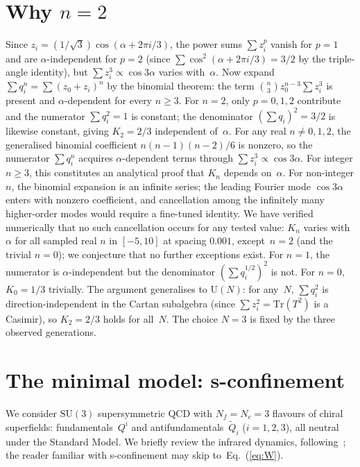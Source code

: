 \documentclass[preprint,12pt]{elsarticle}
\newcommand{\SU}{\mathrm{SU}}
\newcommand{\UU}{\mathrm{U}}
\newcommand{\Nf}{N_{\!f}}
\newcommand{\Nc}{N_{\!c}}
\newcommand{\Tr}{\mathrm{Tr}}
\begin{document}
\section{Why \texorpdfstring{$n=2$}{n=2}}
Since
$z_i = (1/\sqrt{3})\cos(\alpha + 2\pi i/3)$,
the power sums $\sum z_i^p$ vanish for $p = 1$
and are $\alpha$-independent for $p = 2$
(since $\sum \cos^2(\alpha + 2\pi i/3) = 3/2$
by the triple-angle identity), but
$\sum z_i^3 \propto \cos 3\alpha$ varies with~$\alpha$.
Now expand $\sum q_i^n = \sum(z_0+z_i)^n$
by the binomial theorem: the term
$\binom{n}{3}z_0^{n-3}\sum z_i^3$ is present
and $\alpha$-dependent for every $n \geq 3$.
For $n = 2$, only $p = 0,1,2$ contribute
and the numerator $\sum q_i^2 = 1$ is constant;
the denominator $(\sum q_i)^2 = 3/2$ is likewise
constant, giving
$K_2 = 2/3$ independent of~$\alpha$.
For any real $n \neq 0, 1, 2$, the generalised binomial
coefficient $n(n{-}1)(n{-}2)/6$ is nonzero,
so the numerator $\sum q_i^n$ acquires $\alpha$-dependent
terms through $\sum z_i^3 \propto \cos 3\alpha$.
For integer $n \geq 3$, this constitutes an
analytical proof that $K_n$ depends on~$\alpha$.
For non-integer $n$, the binomial expansion is an
infinite series; the leading Fourier mode
$\cos 3\alpha$ enters with nonzero coefficient, and
cancellation among the infinitely many higher-order
modes would require a fine-tuned identity.
We have verified numerically that no such
cancellation occurs for any tested value:
$K_n$ varies with~$\alpha$ for all sampled
real $n$ in $[-5, 10]$ at spacing $0.001$,
except~$n = 2$ (and the trivial $n = 0$);
we conjecture that no further exceptions exist.
For $n = 1$, the numerator is $\alpha$-independent
but the denominator $(\sum q_i^{1/2})^2$ is not.
For $n = 0$, $K_0 = 1/3$ trivially.
The argument generalises to $\UU(N)$: for
any~$N$, $\sum q_i^2$ is direction-independent
in the Cartan subalgebra
(since $\sum z_i^2 = \Tr(T^2)$ is a Casimir),
so $K_2 = 2/3$ holds for all~$N$.
The choice $N = 3$ is fixed by the
three observed generations.

\section{The minimal model: s-confinement}

We consider $\SU(3)$ supersymmetric QCD with
$\Nf = \Nc = 3$ flavours of chiral superfields:
fundamentals~$Q^i$ and antifundamentals~$\tilde{Q}_i$
($i = 1,2,3$), all neutral under the Standard Model.
We briefly review the infrared dynamics,
following~\cite{Seiberg:1994bz,IntriligatorSeibergShenker:1995,Csaki:1996zb};
the reader familiar with s-confinement may skip
to~Eq.~(\ref{eq:W}).
\end{document}
